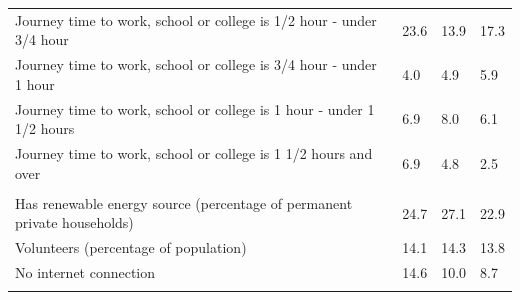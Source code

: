 \documentclass{article}
\begin{document}
\begin{table}[h]
\begin{tabular}{KTTT}
Journey time to work, school or college is 1/2 hour - under 3/4 hour & 23.6& 13.9& 17.3\\
Journey time to work, school or college is 3/4 hour - under 1 hour & 4.0& 4.9& 5.9\\
Journey time to work, school or college is 1 hour - under 1 1/2 hours & 6.9& 8.0& 6.1\\
Journey time to work, school or college is 1 1/2 hours and over & 6.9& 4.8& 2.5\\
\hline
    \\ 
    \hline
Has renewable energy source (percentage of permanent private households) & 24.7& 27.1& 22.9\\
    \hline
Volunteers (percentage of population) & 14.1& 14.3& 13.8\\
    \hline
No internet connection& 14.6& 10.0&  8.7\\
\hline
\end{tabular}
\end{table}
\end{document}
